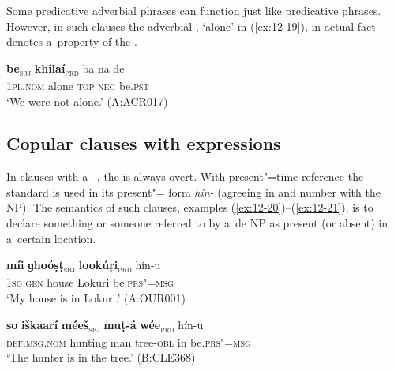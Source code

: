 Some predicative adverbial phrases can function just like predicative  phrases. However, in such clauses the adverbial , `alone' in (\ref{ex:12-19}), in actual fact denotes a~property of the .

\begin{exe}
\ex
\label{ex:12-19}
\gll {\ob}\textbf{be}{\cb}\textsubscript{\textsc{\upshape sbj}} {\ob}\textbf{khilaí}{\cb}\textsubscript{\textsc{\upshape prd}} ba na de \\
\textsc{1pl.nom} alone \textsc{top} \textsc{neg} be.\textsc{pst} \\
\glt `We were not alone.' (A:ACR017)
\end{exe}


\subsection{Copular clauses with  expressions}
\label{subsec:12-1-3}

In clauses with a~  , the  is always overt. With present"=time reference the standard  is used in its present"= form \textit{hín-} (agreeing in  and number with the  NP). The semantics of such clauses, examples (\ref{ex:12-20})--(\ref{ex:12-21}), is to declare something or someone referred to by a~de NP as present (or absent) in a~certain location.

\begin{exe}
\ex
\label{ex:12-20}
\gll {\ob}\textbf{míi} \textbf{ɡhoóṣṭ}{\cb}\textsubscript{\textsc{\upshape sbj}} {\ob}\textbf{lookúṛi}{\cb}\textsubscript{\textsc{\upshape prd}} hín-u \\
\textsc{1sg.gen} house Lokuri be.\textsc{prs"=msg} \\
\glt `My house is in Lokuri.' (A:OUR001)
\end{exe}
\begin{exe}
\ex
\label{ex:12-21}
\gll {\ob}\textbf{so} \textbf{iškaarí} \textbf{méeš}{\cb}\textsubscript{\textsc{\upshape sbj}} {\ob}\textbf{muṭ-á} \textbf{wée}{\cb}\textsubscript{\textsc{\upshape prd}} hín-u \\
\textsc{def.msg.nom} hunting man tree-\textsc{obl} in be.\textsc{prs"=msg} \\
\glt `The hunter is in the tree.' (B:CLE368)
\end{exe}

